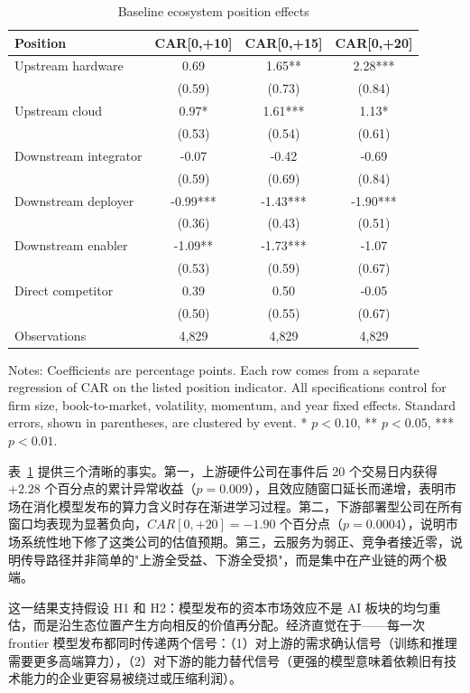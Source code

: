 \documentclass[11pt,fontset=fandol,a4paper]{ctexart}
\begin{document}
\begin{table}[H]
\centering
\small
\caption{Baseline ecosystem position effects}
\label{tab:baseline_position_effects}
\begin{tabular}{lccc}
\toprule
Position & CAR[0,+10] & CAR[0,+15] & CAR[0,+20]\\
\midrule
Upstream hardware & 0.69 & 1.65** & 2.28***\\
 & (0.59) & (0.73) & (0.84)\\
Upstream cloud & 0.97* & 1.61*** & 1.13*\\
 & (0.53) & (0.54) & (0.61)\\
Downstream integrator & -0.07 & -0.42 & -0.69\\
 & (0.59) & (0.69) & (0.84)\\
Downstream deployer & -0.99*** & -1.43*** & -1.90***\\
 & (0.36) & (0.43) & (0.51)\\
Downstream enabler & -1.09** & -1.73*** & -1.07\\
 & (0.53) & (0.59) & (0.67)\\
Direct competitor & 0.39 & 0.50 & -0.05\\
 & (0.50) & (0.55) & (0.67)\\
\midrule
Observations & 4{,}829 & 4{,}829 & 4{,}829\\
\bottomrule
\end{tabular}
\begin{minipage}{0.94\linewidth}
\vspace{0.4em}
\footnotesize
Notes: Coefficients are percentage points. Each row comes from a separate regression of CAR on the listed position indicator. All specifications control for firm size, book-to-market, volatility, momentum, and year fixed effects. Standard errors, shown in parentheses, are clustered by event. * $p<0.10$, ** $p<0.05$, *** $p<0.01$.
\end{minipage}
\end{table}

表~\ref{tab:baseline_position_effects} 提供三个清晰的事实。第一，上游硬件公司在事件后 20 个交易日内获得 $+2.28$ 个百分点的累计异常收益（$p=0.009$），且效应随窗口延长而递增，表明市场在消化模型发布的算力含义时存在渐进学习过程。第二，下游部署型公司在所有窗口均表现为显著负向，$CAR[0,+20]=-1.90$ 个百分点（$p=0.0004$），说明市场系统性地下修了这类公司的估值预期。第三，云服务为弱正、竞争者接近零，说明传导路径并非简单的"上游全受益、下游全受损"，而是集中在产业链的两个极端。

这一结果支持假设 H1 和 H2：模型发布的资本市场效应不是 AI 板块的均匀重估，而是沿生态位置产生方向相反的价值再分配。经济直觉在于——每一次 frontier 模型发布都同时传递两个信号：（1）对上游的需求确认信号（训练和推理需要更多高端算力），（2）对下游的能力替代信号（更强的模型意味着依赖旧有技术能力的企业更容易被绕过或压缩利润）。
\end{document}
